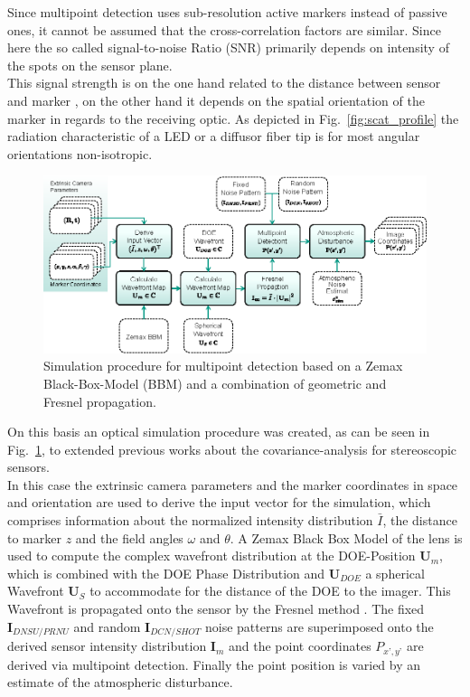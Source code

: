 \documentclass[5p,times,procedia]{elsarticle}
\begin{document}
Since multipoint detection \cite{Haist2015} uses sub-resolution active markers instead of passive ones, it cannot be assumed that the cross-correlation factors are similar. Since here the so called signal-to-noise Ratio (SNR) primarily depends on intensity of the spots on the sensor plane. \\
This signal strength is on the one hand related to the distance between sensor and marker \cite{dumbleton1955}, on the other hand it depends on the spatial orientation of the marker in regards to the receiving optic. As depicted in Fig.~\ref{fig:scat_profile}
the radiation characteristic of a LED or a diffusor fiber tip \cite{Pan1994} is for most angular orientations non-isotropic.\\

\begin{figure}[!htb]
	\centering
	\includegraphics[width=\columnwidth]{graphics/OpticalSimulation.eps}
	\caption{Simulation procedure for multipoint detection based on a Zemax Black-Box-Model (BBM) and a combination of geometric and Fresnel propagation.}
	\label{fig:opto-sim}
\end{figure}

On this basis an optical simulation procedure was created, as can be seen in Fig.~\ref{fig:opto-sim}, to extended previous works \cite{Liu_2021,Di_Leo_2011} about the covariance-analysis for stereoscopic sensors.
\\
In this case the extrinsic camera parameters and the marker coordinates in space and orientation are used to derive
the input vector for the simulation, which comprises information about the normalized intensity distribution $\bar{I}$, the distance to marker $z$ and the field angles $\omega$ and $\theta$. A Zemax Black Box Model of the lens is used to compute the complex wavefront distribution at the DOE-Position $\mathbf{U}_m$, which is combined with the DOE Phase Distribution and $\mathbf{U}_{DOE}$ a spherical Wavefront $\mathbf{U}_{S}$ to accommodate for the distance of the DOE to the imager. This Wavefront is propagated onto the sensor by the Fresnel method \cite{Goodman2005}. The fixed $\mathbf{I}_{DNSU/PRNU}$ and random $\mathbf{I}_{DCN/SHOT}$ noise patterns are superimposed onto the derived sensor intensity distribution $\mathbf{I}_m$ and the point coordinates $P_{x’,y’}$ are derived via multipoint detection.
Finally the point position is varied by an estimate of the atmospheric disturbance.\\
\end{document}
